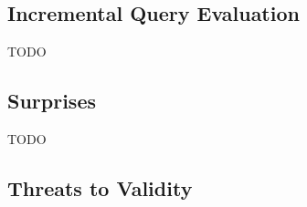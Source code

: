 
\subsection{Incremental Query Evaluation}
TODO

% 

 
 

\subsection{Surprises}
TODO

\subsection{Threats to Validity}

